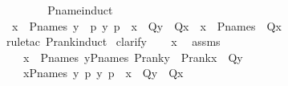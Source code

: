 \begin{isabellebody}
\ \ \ \ \isamarkupfalse%
\isanewline
{}\isamarkupfalse%
%
\endisatagproof
{\isafoldproof}%
%
\isadelimproof
\isanewline
%
\endisadelimproof
\ \ \isanewline
{}\isamarkupfalse%
\ P{\isacharunderscore}{\kern0pt}name{\isacharunderscore}{\kern0pt}induct\ {\isacharcolon}{\kern0pt}\ \isanewline
\ \ {\isachardoublequoteopen}{\isasymforall}x\ {\isasymin}\ P{\isacharunderscore}{\kern0pt}names{\isachardot}{\kern0pt}\ {\isacharparenleft}{\kern0pt}{\isasymforall}y{\isachardot}{\kern0pt}\ {\isasymforall}\ p{\isachardot}{\kern0pt}\ {\isacharless}{\kern0pt}y{\isacharcomma}{\kern0pt}\ p{\isachargreater}{\kern0pt}\ {\isasymin}\ x\ {\isasymlongrightarrow}\ Q{\isacharparenleft}{\kern0pt}y{\isacharparenright}{\kern0pt}{\isacharparenright}{\kern0pt}\ {\isasymlongrightarrow}\ Q{\isacharparenleft}{\kern0pt}x{\isacharparenright}{\kern0pt}\ {\isasymLongrightarrow}\ x\ {\isasymin}\ P{\isacharunderscore}{\kern0pt}names\ {\isasymLongrightarrow}\ Q{\isacharparenleft}{\kern0pt}x{\isacharparenright}{\kern0pt}{\isachardoublequoteclose}\isanewline
%
\isadelimproof
\ \ %
\endisadelimproof
%
\isatagproof
{}\isamarkupfalse%
\ {\isacharparenleft}{\kern0pt}rule{\isacharunderscore}{\kern0pt}tac\ P{\isacharunderscore}{\kern0pt}rank{\isacharunderscore}{\kern0pt}induct{\isacharparenright}{\kern0pt}\isanewline
{}\isamarkupfalse%
\ {\isacharparenleft}{\kern0pt}clarify{\isacharparenright}{\kern0pt}\isanewline
\ \ \isamarkupfalse%
\ x\ \isamarkupfalse%
\ assms{\isacharcolon}{\kern0pt}\ \isanewline
\ \ \ \ {\isachardoublequoteopen}x\ {\isasymin}\ P{\isacharunderscore}{\kern0pt}names{\isachardoublequoteclose}\ {\isachardoublequoteopen}{\isasymforall}y{\isasymin}P{\isacharunderscore}{\kern0pt}names{\isachardot}{\kern0pt}\ P{\isacharunderscore}{\kern0pt}rank{\isacharparenleft}{\kern0pt}y{\isacharparenright}{\kern0pt}\ {\isacharless}{\kern0pt}\ P{\isacharunderscore}{\kern0pt}rank{\isacharparenleft}{\kern0pt}x{\isacharparenright}{\kern0pt}\ {\isasymlongrightarrow}\ Q{\isacharparenleft}{\kern0pt}y{\isacharparenright}{\kern0pt}{\isachardoublequoteclose}\isanewline
\ \ \ \ {\isachardoublequoteopen}{\isasymforall}x{\isasymin}P{\isacharunderscore}{\kern0pt}names{\isachardot}{\kern0pt}\ {\isacharparenleft}{\kern0pt}{\isasymforall}y\ p{\isachardot}{\kern0pt}\ {\isasymlangle}y{\isacharcomma}{\kern0pt}\ p{\isasymrangle}\ {\isasymin}\ x\ {\isasymlongrightarrow}\ Q{\isacharparenleft}{\kern0pt}y{\isacharparenright}{\kern0pt}{\isacharparenright}{\kern0pt}\ {\isasymlongrightarrow}\ Q{\isacharparenleft}{\kern0pt}x{\isacharparenright}{\kern0pt}{\isachardoublequoteclose}\ \isanewline

\end{isabellebody}
